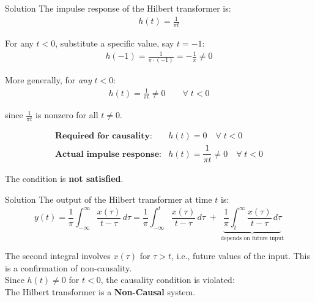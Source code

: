 \documentclass{beamer}
\begin{document}
\begin{frame}{Solution}
The impulse response of the Hilbert transformer is:
\begin{align}
h(t) = \frac{1}{\pi t}
\end{align}

For any $t < 0$, substitute a specific value, say $t = -1$:
\begin{align}
h(-1) = \frac{1}{\pi \cdot (-1)} = -\frac{1}{\pi} \neq 0
\end{align}

More generally, for \textit{any} $t < 0$:
\begin{align}
h(t) = \frac{1}{\pi t} \neq 0 \qquad \forall\; t < 0
\end{align}

since $\frac{1}{\pi t}$ is nonzero for all $t \neq 0$.

\begin{align}
\textbf{Required for causality:} & h(t) = 0 \quad \forall\; t < 0 \\[6pt]
\textbf{Actual impulse response:} & h(t) = \dfrac{1}{\pi t} \neq 0
\quad \forall\; t < 0
\end{align}

The condition is \textbf{not satisfied}.
\end{frame}

\begin{frame}{Solution}
  The output of the Hilbert transformer at time $t$ is:
\[
y(t) = \frac{1}{\pi} \int_{-\infty}^{\infty}
\frac{x(\tau)}{t - \tau}\, d\tau
= \frac{1}{\pi} \int_{-\infty}^{t} \frac{x(\tau)}{t-\tau}\,d\tau
\;+\;
\underbrace{\frac{1}{\pi} \int_{t}^{\infty}
\frac{x(\tau)}{t - \tau}\, d\tau}_{\text{depends on future input}}
\]

The second integral involves $x(\tau)$ for $\tau > t$, i.e., future
values of the input. This is a confirmation of non-causality.\\


Since $h(t) \neq 0$ for $t < 0$, the causality condition is violated: \\

The Hilbert transformer is a \textbf{Non-Causal} system.

\end{frame}
\end{document}
